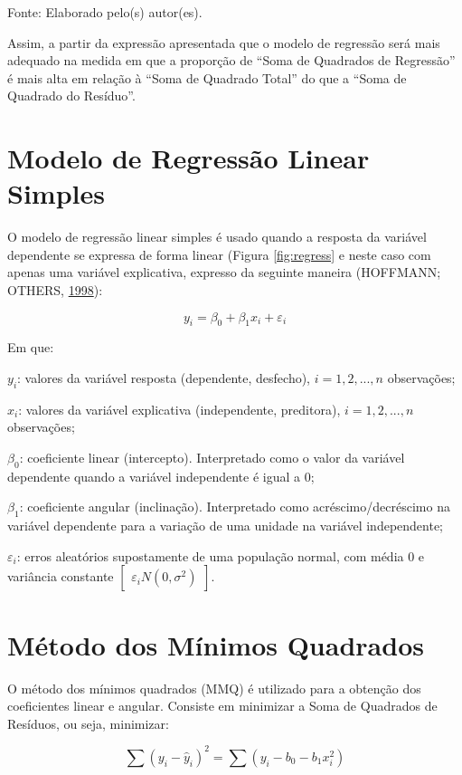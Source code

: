 \documentclass[12pt,portuguese,oneside]{book}
\begin{document}
Fonte: Elaborado pelo(s) autor(es).

Assim, a partir da expressão apresentada que o modelo de regressão será
mais adequado na medida em que a proporção de ``Soma de Quadrados de
Regressão'' é mais alta em relação à ``Soma de Quadrado Total'' do que a
``Soma de Quadrado do Resíduo''.

\section{Modelo de Regressão Linear
Simples}\label{modelo-de-regressao-linear-simples}

O modelo de regressão linear simples é usado quando a resposta da
variável dependente se expressa de forma linear (Figura
\ref{fig:regress} e neste caso com apenas uma variável explicativa,
expresso da seguinte maneira (HOFFMANN; OTHERS,
\protect\hyperlink{ref-hoffmann1998}{1998}):

\[
y_i=\beta_0+\beta_1x_i+\varepsilon _i
\]

Em que:

\(y_i\): valores da variável resposta (dependente, desfecho),
\(i = 1,2,...,n\) observações;

\(x_i\): valores da variável explicativa (independente, preditora),
\(i = 1,2,...,n\) observações;

\(\beta_0\): coeficiente linear (intercepto). Interpretado como o valor
da variável dependente quando a variável independente é igual a 0;

\(\beta_1\): coeficiente angular (inclinação). Interpretado como
acréscimo/decréscimo na variável dependente para a variação de uma
unidade na variável independente;

\(\varepsilon_i\): erros aleatórios supostamente de uma população
normal, com média 0 e variância constante
\(\begin{bmatrix}\varepsilon_i N(0, \sigma^2)\end{bmatrix}\).

\section{Método dos Mínimos
Quadrados}\label{metodo-dos-minimos-quadrados}

O método dos mínimos quadrados (MMQ) é utilizado para a obtenção dos
coeficientes linear e angular. Consiste em minimizar a Soma de Quadrados
de Resíduos, ou seja, minimizar:

\[
\sum (y_i-\hat y_i)^2=\sum (y_i-b_0-b_1x_i^2)
\]
\end{document}
